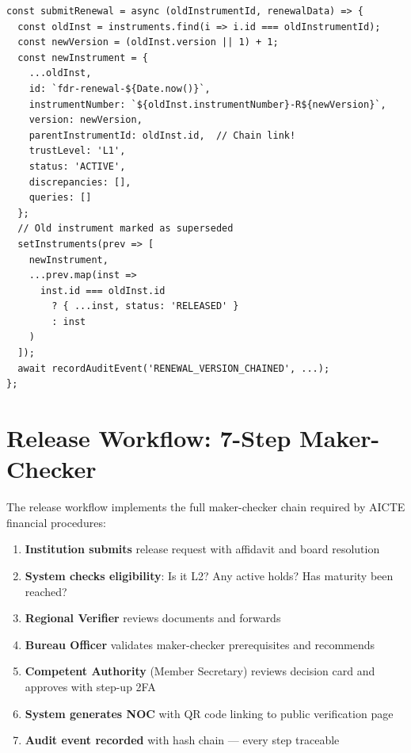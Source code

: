 \documentclass[12pt, a4paper]{report}
\begin{document}
\begin{lstlisting}[caption={Renewal with Version Chaining (AppContext.tsx)}, label={lst:renewal}]
const submitRenewal = async (oldInstrumentId, renewalData) => {
  const oldInst = instruments.find(i => i.id === oldInstrumentId);
  const newVersion = (oldInst.version || 1) + 1;
  const newInstrument = {
    ...oldInst,
    id: `fdr-renewal-${Date.now()}`,
    instrumentNumber: `${oldInst.instrumentNumber}-R${newVersion}`,
    version: newVersion,
    parentInstrumentId: oldInst.id,  // Chain link!
    trustLevel: 'L1',
    status: 'ACTIVE',
    discrepancies: [],
    queries: []
  };
  // Old instrument marked as superseded
  setInstruments(prev => [
    newInstrument,
    ...prev.map(inst =>
      inst.id === oldInst.id
        ? { ...inst, status: 'RELEASED' }
        : inst
    )
  ]);
  await recordAuditEvent('RENEWAL_VERSION_CHAINED', ...);
};
\end{lstlisting}

\section{Release Workflow: 7-Step Maker-Checker}

The release workflow implements the full maker-checker chain required by AICTE financial procedures:

\begin{enumerate}[label=\textbf{Step \arabic*:}]
  \item \textbf{Institution submits} release request with affidavit and board resolution
  \item \textbf{System checks eligibility}: Is it L2? Any active holds? Has maturity been reached?
  \item \textbf{Regional Verifier} reviews documents and forwards
  \item \textbf{Bureau Officer} validates maker-checker prerequisites and recommends
  \item \textbf{Competent Authority} (Member Secretary) reviews decision card and approves with step-up 2FA
  \item \textbf{System generates NOC} with QR code linking to public verification page
  \item \textbf{Audit event recorded} with hash chain --- every step traceable
\end{enumerate}


\end{document}
